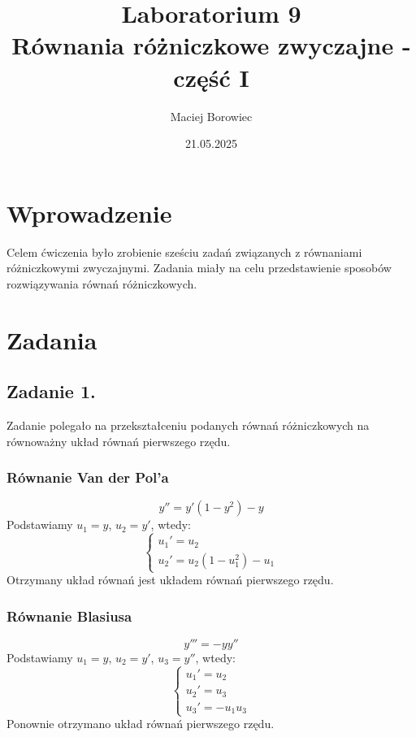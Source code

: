 \documentclass{article}
\title{Laboratorium 9 \\ Równania różniczkowe zwyczajne - część I}
\author{Maciej Borowiec}
\date{21.05.2025}
\begin{document}
\maketitle

\section{Wprowadzenie}
Celem ćwiczenia było zrobienie sześciu zadań związanych z równaniami różniczkowymi zwyczajnymi. Zadania miały na celu przedstawienie sposobów rozwiązywania równań różniczkowych.

\section{Zadania}

\subsection{Zadanie 1.}
Zadanie polegało na przekształceniu podanych równań różniczkowych na równoważny układ równań pierwszego rzędu.

\subsubsection{Równanie Van der Pol'a}
$$y'' = y'(1- y^2) - y$$
Podstawiamy $u_1 = y$, $u_2 = y'$, wtedy:
\begin{equation}
    \begin{cases}
        u_1' = u_2 \\
        u_2' = u_2(1-u_1^2)-u_1
    \end{cases} \nonumber
\end{equation}
Otrzymany układ równań jest układem równań pierwszego rzędu.

\subsubsection{Równanie Blasiusa}
$$y''' = -yy''$$
Podstawiamy $u_1 = y$, $u_2 = y'$, $u_3 = y''$, wtedy:
\begin{equation}
    \begin{cases}
        u_1' = u_2 \\
        u_2' = u_3 \\
        u_3' = -u_1u_3
    \end{cases} \nonumber
\end{equation}
Ponownie otrzymano układ równań pierwszego rzędu.
\end{document}
